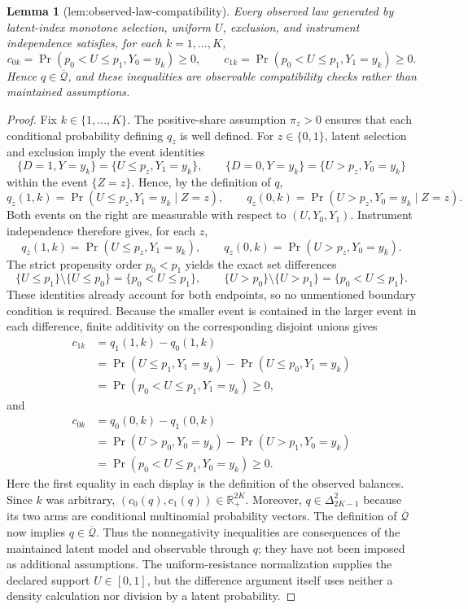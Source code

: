 \documentclass{article}
\newtheorem{lemma}{Lemma}
\begin{document}
\begin{lemma}[lem:observed-law-compatibility]\label{lem:observed-law-compatibility}
Every observed law generated by latent-index monotone selection, uniform \(U\), exclusion, and instrument independence satisfies, for each \(k=1,\ldots,K\), \[c_{0k}=\Pr(p_0<U\le p_1,Y_0=y_k)\ge0,\qquad c_{1k}=\Pr(p_0<U\le p_1,Y_1=y_k)\ge0.\] Hence \(q\in\overline{\mathcal Q}\), and these inequalities are observable compatibility checks rather than maintained assumptions.
\end{lemma}
\begin{proof}
Fix \(k\in\{1,\ldots,K\}\).  The positive-share assumption \(\pi_z>0\) ensures that each conditional probability defining \(q_z\) is well defined.  For \(z\in\{0,1\}\), latent selection and exclusion imply the event identities
\[
\{D=1,Y=y_k\}=\{U\le p_z,Y_1=y_k\},\qquad
\{D=0,Y=y_k\}=\{U>p_z,Y_0=y_k\}
\]
within the event \(\{Z=z\}\).  Hence, by the definition of \(q\),
\[
q_z(1,k)=\Pr(U\le p_z,Y_1=y_k\mid Z=z),\qquad
q_z(0,k)=\Pr(U>p_z,Y_0=y_k\mid Z=z).
\]
Both events on the right are measurable with respect to \((U,Y_0,Y_1)\).  Instrument independence therefore gives, for each \(z\),
\[
q_z(1,k)=\Pr(U\le p_z,Y_1=y_k),\qquad
q_z(0,k)=\Pr(U>p_z,Y_0=y_k).
\]
The strict propensity order \(p_0<p_1\) yields the exact set differences
\[
\{U\le p_1\}\setminus\{U\le p_0\}=\{p_0<U\le p_1\},
\qquad
\{U>p_0\}\setminus\{U>p_1\}=\{p_0<U\le p_1\}.
\]
These identities already account for both endpoints, so no unmentioned boundary condition is required.  Because the smaller event is contained in the larger event in each difference, finite additivity on the corresponding disjoint unions gives
\[
\begin{aligned}
c_{1k}
&=q_1(1,k)-q_0(1,k)\\
&=\Pr(U\le p_1,Y_1=y_k)-\Pr(U\le p_0,Y_1=y_k)\\
&=\Pr(p_0<U\le p_1,Y_1=y_k)\ge0,
\end{aligned}
\]
and
\[
\begin{aligned}
c_{0k}
&=q_0(0,k)-q_1(0,k)\\
&=\Pr(U>p_0,Y_0=y_k)-\Pr(U>p_1,Y_0=y_k)\\
&=\Pr(p_0<U\le p_1,Y_0=y_k)\ge0.
\end{aligned}
\]
Here the first equality in each display is the definition of the observed balances.  Since \(k\) was arbitrary, \((c_0(q),c_1(q))\in\mathbb R_+^{2K}\).  Moreover, \(q\in\Delta_{2K-1}^2\) because its two arms are conditional multinomial probability vectors.  The definition of \(\overline{\mathcal Q}\) now implies \(q\in\overline{\mathcal Q}\).  Thus the nonnegativity inequalities are consequences of the maintained latent model and observable through \(q\); they have not been imposed as additional assumptions.  The uniform-resistance normalization supplies the declared support \(U\in[0,1]\), but the difference argument itself uses neither a density calculation nor division by a latent probability.
\end{proof}
\end{document}
